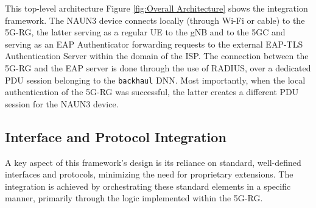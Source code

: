 This top-level architecture Figure \ref{fig:Overall Architecture} shows the integration framework. The \ac{NAUN3} device connects locally (through Wi-Fi or cable) to the \ac{5G-RG}, the latter serving as a regular \ac{UE} to the \ac{gNB} and to the \ac{5GC} and serving as an \ac{EAP} Authenticator forwarding requests to the external \ac{EAP-TLS} Authentication Server within the domain of the \ac{ISP}. The connection between the \ac{5G-RG} and the \ac{EAP} server is done through the use of \ac{RADIUS}, over a dedicated \ac{PDU} session belonging to the \texttt{backhaul} \ac{DNN}. Most importantly, when the local authentication of the \ac{5G-RG} was successful, the latter creates a different \ac{PDU} session for the \ac{NAUN3} device.

\subsection{Interface and Protocol Integration}

A key aspect of this framework's design is its reliance on standard, well-defined interfaces and protocols, minimizing the need for proprietary extensions. The integration is achieved by orchestrating these standard elements in a specific manner, primarily through the logic implemented within the \ac{5G-RG}.

